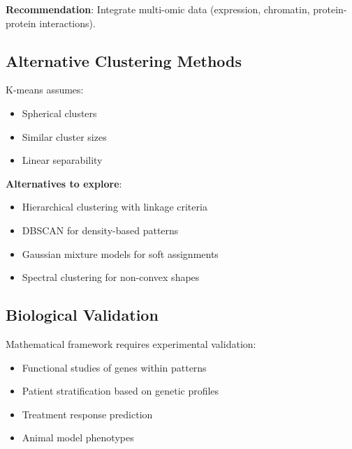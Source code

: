 \documentclass[12pt,letterpaper]{article}
\theoremstyle{definition}
\theoremstyle{remark}
\begin{document}
\textbf{Recommendation}: Integrate multi-omic data (expression, chromatin, protein-protein interactions).

\subsection{Alternative Clustering Methods}

K-means assumes:
\begin{itemize}
    \item Spherical clusters
    \item Similar cluster sizes
    \item Linear separability
\end{itemize}

\textbf{Alternatives to explore}:
\begin{itemize}
    \item Hierarchical clustering with linkage criteria
    \item DBSCAN for density-based patterns
    \item Gaussian mixture models for soft assignments
    \item Spectral clustering for non-convex shapes
\end{itemize}

\subsection{Biological Validation}

Mathematical framework requires experimental validation:
\begin{itemize}
    \item Functional studies of genes within patterns
    \item Patient stratification based on genetic profiles
    \item Treatment response prediction
    \item Animal model phenotypes
\end{itemize}
\end{document}
